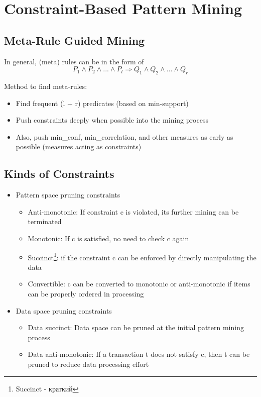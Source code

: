 \section{Constraint-Based Pattern Mining}
\subsection{Meta-Rule Guided Mining}
In general, (meta) rules can be in the form of
\begin{equation*}
P_1 \wedge P_2 \wedge ... \wedge P_l \Rightarrow Q_1 \wedge Q_2 \wedge ... \wedge Q_r
\end{equation*}

Method to find meta-rules:
\begin{itemize}
\item Find frequent (l + r) predicates (based on min-support)
\item Push constraints deeply when possible into the mining process
\item Also, push min\_conf, min\_correlation, and other measures as early as possible (measures acting as constraints)
\end{itemize}

\subsection{Kinds of Constraints}
\begin{itemize}
\item Pattern space pruning constraints
\begin{itemize}
\item Anti-monotonic: If constraint c is violated, its further mining can be terminated
\item Monotonic: If c is satisfied, no need to check c again
\item Succinct\footnote{Succinct - краткий}: if the constraint c can be enforced by directly manipulating the data
\item Convertible: c can be converted to monotonic or anti-monotonic if items can be properly ordered in processing
\end{itemize}
\item Data space pruning constraints
\begin{itemize}
\item Data succinct: Data space can be pruned at the initial pattern mining process
\item Data anti-monotonic: If a transaction t does not satisfy c, then t can be pruned to reduce data processing effort
\end{itemize}
\end{itemize}

